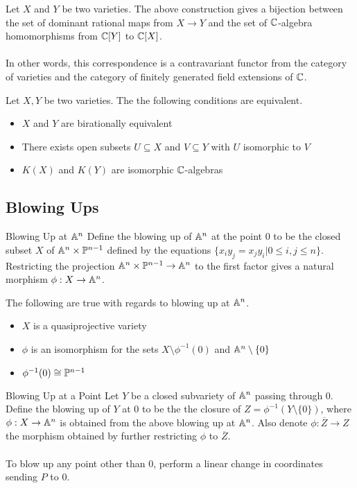 \documentclass[a4paper]{article}
\begin{document}
\begin{thm}{}{} Let $X$ and $Y$ be two varieties. The above construction gives a bijection between the set of dominant rational maps from $X\to Y$ and the set of $\mathbb{C}$-algebra homomorphisms from $\mathbb{C}[Y]$ to $\mathbb{C}[X]$. \\~\\
In other words, this correspondence is a contravariant functor from the category of varieties and the category of finitely generated field extensions of $\mathbb{C}$. 
\end{thm}

\begin{crl}{}{} Let $X,Y$ be two varieties. The the following conditions are equivalent. 
\begin{itemize}
\item $X$ and $Y$ are birationally equivalent
\item There exists open subsets $U\subseteq X$ and $V\subseteq Y$ with $U$ isomorphic to $V$
\item $K(X)$ and $K(Y)$ are isomorphic $\mathbb{C}$-algebras
\end{itemize}
\end{crl}

\subsection{Blowing Ups}
\begin{defn}{Blowing Up at $\mathbb{A}^n$}{} Define the blowing up of $\mathbb{A}^n$ at the point $0$ to be the closed subset $X$ of $\mathbb{A}^n\times\mathbb{P}^{n-1}$ defined by the equations $\{x_iy_j=x_jy_i|0\leq i,j\leq n\}$. Restricting the projection $\mathbb{A}^n\times\mathbb{P}^{n-1}\to\mathbb{A}^n$ to the first factor gives a natural morphism $\phi:X\to\mathbb{A}^n$. 
\end{defn}

\begin{thm}{}{} The following are true with regards to blowing up at $\mathbb{A}^n$. 
\begin{itemize}
\item $X$ is a quasiprojective variety
\item $\phi$ is an isomorphism for the sets $X\setminus\phi^{-1}(0)$ and $\mathbb{A}^n\setminus\{0\}$
\item $\phi^{-1}(0)\cong\mathbb{P}^{n-1}$
\end{itemize}
\end{thm}

\begin{defn}{Blowing Up at a Point}{} Let $Y$ be a closed subvariety of $\mathbb{A}^n$ passing through $0$. Define the blowing up of $Y$ at $0$ to be the the closure of $Z=\phi^{-1}(Y\setminus\{0\})$, where $\phi:X\to\mathbb{A}^n$ is obtained from the above blowing up at $\mathbb{A}^n$. Also denote $\phi:\overline{Z}\to Z$ the morphism obtained by further restricting $\phi$ to $\overline{Z}$. \\~\\
To blow up any point other than $0$, perform a linear change in coordinates sending $P$ to $0$. 
\end{defn}
\end{document}
